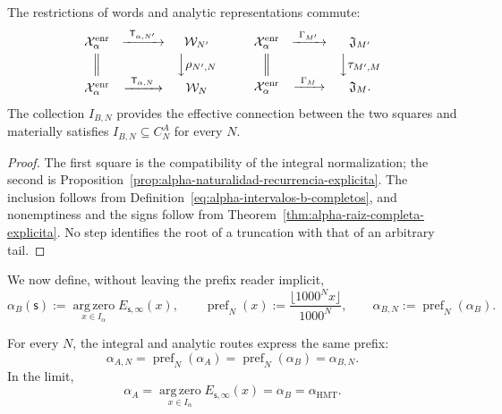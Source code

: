 \begin{proposition}
\label{prop:alpha-cuadrados-compatibilidad}
The restrictions of words and analytic representations commute:
\[
\begin{array}{ccc}
 \mathcal X_\alpha^{\mathrm{enr}}&
 \xrightarrow{\ \mathsf T_{\alpha,N'}\ }&\mathcal W_{N'}\\[1mm]
 \Big\Vert&&\Big\downarrow\rho_{N',N}\\[1mm]
 \mathcal X_\alpha^{\mathrm{enr}}&
 \xrightarrow{\ \mathsf T_{\alpha,N}\ }&\mathcal W_N
\end{array}
\qquad
\begin{array}{ccc}
 \mathcal X_\alpha^{\mathrm{enr}}&
 \xrightarrow{\ \Gamma_{M'}\ }&\mathfrak J_{M'}\\[1mm]
 \Big\Vert&&\Big\downarrow\tau_{M',M}\\[1mm]
 \mathcal X_\alpha^{\mathrm{enr}}&
 \xrightarrow{\ \Gamma_M\ }&\mathfrak J_M .
\end{array}
\]
The collection \(I_{B,N}\) provides the effective connection between the two
squares and materially satisfies \(I_{B,N}\subseteq C_N^A\) for every \(N\).
\end{proposition}

\begin{proof}
The first square is the compatibility of the integral normalization; the
second is Proposition~\ref{prop:alpha-naturalidad-recurrencia-explicita}.
The inclusion follows from Definition~\eqref{eq:alpha-intervalos-b-completos},
and nonemptiness and the signs follow from
Theorem~\ref{thm:alpha-raiz-completa-explicita}. No step identifies the root
of a truncation with that of an arbitrary tail.
\end{proof}

We now define, without leaving the prefix reader implicit,
\begin{equation}
 \alpha_B(\mathsf s):=
 \operatorname*{arg\,zero}_{x\in I_\alpha}E_{\mathsf s,\infty}(x),
 \qquad
 \operatorname{pref}_N(x):=
 \frac{\lfloor1000^Nx\rfloor}{1000^N},
 \qquad
 \alpha_{B,N}:=\operatorname{pref}_N(\alpha_B).
 \label{eq:alpha-definicion-b-y-prefijos-rev08}
\end{equation}

\begin{theorem}
\label{prop:alpha-dos-limites}
For every \(N\), the integral and analytic routes express the same prefix:
\begingroup
\renewcommand{\theequation}{A7\(_0\)}
\begin{equation}
 \boxed{\alpha_{A,N}=\operatorname{pref}_N(\alpha_A)
 =\operatorname{pref}_N(\alpha_B)=\alpha_{B,N}.}
 \label{eq:alpha-dos-vias-cada-nivel}
\end{equation}
\endgroup
In the limit,
\begingroup
\renewcommand{\theequation}{A8\(_0\)}
\begin{equation}
 \boxed{\alpha_A
 =\operatorname*{arg\,zero}_{x\in I_\alpha}
       E_{\mathsf s,\infty}(x)
 =\alpha_B=\alpha_{\mathrm{HMT}}.}
 \label{eq:alpha-dos-vias-limite-coinductivo}
\end{equation}
\endgroup
\end{theorem}

